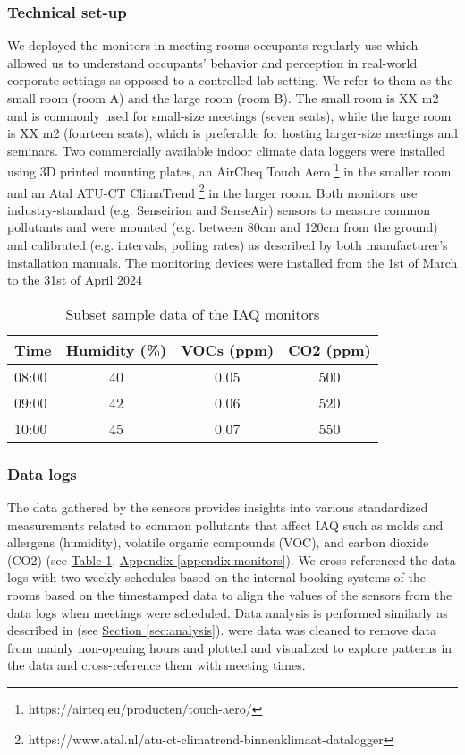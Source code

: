 \subsubsection{Technical set-up}

We deployed the monitors in meeting rooms occupants regularly use which allowed us to understand occupants' behavior and perception in real-world corporate settings as opposed to a controlled lab setting. We refer to them as the small room (room A) and the large room (room B). The small room is XX m2 and is commonly used for small-size meetings (seven seats), while the large room is XX m2 (fourteen seats), which is preferable for hosting larger-size meetings and seminars. Two commercially available indoor climate data loggers were installed using 3D printed mounting plates, an AirCheq Touch Aero \footnote{https://airteq.eu/producten/touch-aero/} in the smaller room and an Atal ATU-CT ClimaTrend \footnote{https://www.atal.nl/atu-ct-climatrend-binnenklimaat-datalogger} in the larger room. Both monitors use industry-standard (e.g. Senseirion and SenseAir) sensors to measure common pollutants and were mounted (e.g. between 80cm and 120cm from the ground) and calibrated (e.g. intervals, polling rates) as described by both manufacturer's installation manuals. The monitoring devices were installed from the 1st of March to the 31st of April 2024

\begin{table}[htbp]
    \centering
    \caption{Subset sample data of the IAQ monitors}
    \begin{tabular}{lccc}
        \toprule
        \textbf{Time} & \textbf{Humidity (\%)} & \textbf{VOCs (ppm)} & \textbf{CO2 (ppm)} \\
        \midrule
        08:00 & 40 & 0.05 & 500 \\
        09:00 & 42 & 0.06 & 520 \\
        10:00 & 45 & 0.07 & 550 \\
        \bottomrule
    \end{tabular}
    \label{tab:air-quality}
\end{table}

\subsubsection{Data logs}

The data gathered by the sensors provides insights into various standardized measurements related to common pollutants that affect IAQ such as molds and allergens (humidity), volatile organic compounds (VOC), and carbon dioxide (CO2) (see \hyperref[tab:air-quality]{Table \ref*{tab:air-quality}}, \hyperref[appendix:monitors]{Appendix \ref*{appendix:monitors}}). We cross-referenced the data logs with two weekly schedules based on the internal booking systems of the rooms based on the timestamped data to align the values of the sensors from the data logs when meetings were scheduled. Data analysis is performed similarly as described in (see \hyperref[sec:analysis]{Section \ref*{sec:analysis}}). were data was cleaned to remove data from mainly non-opening hours and plotted and visualized to explore patterns in the data and cross-reference them with meeting times.


